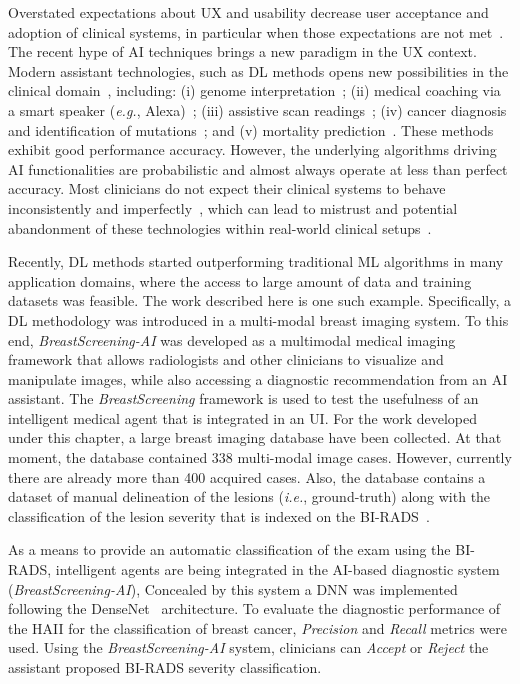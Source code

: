 Overstated expectations about \ac{UX} and usability decrease user acceptance and adoption of clinical systems, in particular when those expectations are not met~\cite{Inkpen:2019:HBG:3290607.3299002, Kocielnik:2019:YAI:3290605.3300641, Oh:2018:ILY:3173574.3174223}.
The recent hype of \ac{AI} techniques brings a new paradigm in the \ac{UX} context.
Modern assistant technologies, such as \ac{DL} methods opens new possibilities in the clinical domain~\cite{topol2019high}, including:
(i) genome interpretation~\cite{sundaram2018predicting};
(ii) medical coaching via a smart speaker ({\it e.g.}, Alexa)~\cite{bickmore2018patient};
(iii) assistive scan readings~\cite{madani2018deep};
(iv) cancer diagnosis and identification of mutations~\cite{coudray2018classification}; and
(v) mortality prediction~\cite{ahmad2018death}.
These methods exhibit good performance accuracy.
However, the underlying algorithms driving \ac{AI} functionalities are probabilistic and almost always operate at less than perfect accuracy.
Most clinicians do not expect their clinical systems to behave inconsistently and imperfectly~\cite{hoff2015trust, Kocielnik:2019:YAI:3290605.3300641}, which can lead to mistrust and potential abandonment of these technologies within real-world clinical setups~\cite{benrimoh2018aifred}.

Recently, \ac{DL} methods started outperforming traditional \ac{ML} algorithms in many application domains, where the access to large amount of data and training datasets was feasible.
The work described here is one such example. Specifically, a \ac{DL} methodology was introduced in a multi-modal breast imaging system.
To this end, {\it BreastScreening-AI} was developed as a multimodal medical imaging framework that allows radiologists and other clinicians to visualize and manipulate images, while also accessing a diagnostic recommendation from an \ac{AI} assistant.
The {\it BreastScreening} framework is used to test the usefulness of an intelligent medical agent that is integrated in an \ac{UI}.
For the work developed under this chapter, a large breast imaging database have been collected.
At that moment, the database contained 338 multi-modal image cases.
However, currently there are already more than 400 acquired cases.
Also, the database contains a dataset of manual delineation of the lesions ({\it i.e.}, ground-truth)
along with the classification of the lesion severity that is indexed on the \ac{BI-RADS}~\cite{ghosh2019artificial}.

As a means to provide an automatic classification of the exam using the \ac{BI-RADS}, intelligent agents are being integrated in the \ac{AI}-based diagnostic system ({\it BreastScreening-AI}),
Concealed by this system a \ac{DNN} was implemented following the DenseNet~\cite{chen2019learning} architecture.
To evaluate the diagnostic performance of the \ac{HAII} for the classification of breast cancer, {\it Precision} and  {\it Recall} metrics were used.
Using the {\it BreastScreening-AI} system, clinicians can {\it Accept} or {\it Reject} the assistant proposed \ac{BI-RADS} severity classification.

